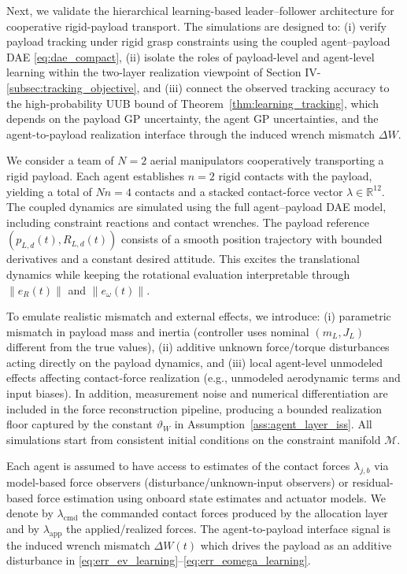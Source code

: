 \documentclass[letterpaper, 10 pt, conference]{ieeeconf}  %
\newcommand{\0}{\matr{0}}
\begin{document}
Next, we validate the hierarchical learning-based leader--follower architecture for cooperative rigid-payload transport.
The simulations are designed to: (i) verify payload tracking under rigid grasp constraints using the coupled agent--payload DAE \eqref{eq:dae_compact},
(ii) isolate the roles of payload-level and agent-level learning within the two-layer realization viewpoint of Section IV-\ref{subsec:tracking_objective}, and
(iii)  connect the observed tracking accuracy to the high-probability UUB bound of Theorem~\ref{thm:learning_tracking}, which depends on
the payload GP uncertainty, the agent GP uncertainties, and the agent-to-payload realization interface through the induced wrench mismatch $\Delta W$.


We consider a team of $N=2$ aerial manipulators cooperatively transporting a rigid payload.
Each agent establishes $n=2$ rigid contacts with the payload, yielding a total of $Nn=4$ contacts and a stacked contact-force vector
$\lambda\in\mathbb R^{12}$.
The coupled dynamics are simulated using the full agent--payload DAE model, including constraint reactions and contact wrenches. The payload reference $(p_{L,d}(t),R_{L,d}(t))$ consists of a smooth position trajectory with bounded derivatives and a constant desired attitude.
This excites the translational dynamics while keeping the rotational evaluation interpretable through $\|e_R(t)\|$ and $\|e_\omega(t)\|$.

To emulate realistic mismatch and external effects, we introduce:
(i) parametric mismatch in payload mass and inertia (controller uses nominal $(m_L,J_L)$ different from the true values),
(ii) additive unknown force/torque disturbances acting directly on the payload dynamics, and
(iii) local agent-level unmodeled effects affecting contact-force realization (e.g., unmodeled aerodynamic terms and input biases).
In addition, measurement noise and numerical differentiation are included in the force reconstruction pipeline, producing a bounded realization floor
captured by the constant $\vartheta_W$ in Assumption~\ref{ass:agent_layer_iss}.
All simulations start from consistent initial conditions on the constraint manifold $\mathcal{M}$.


Each agent is assumed to have access to estimates of the contact forces $\lambda_{j,b}$ via model-based force observers (disturbance/unknown-input observers) or residual-based force estimation using onboard state estimates and actuator models.
We denote by $\lambda_{\mathrm{cmd}}$ the commanded contact forces produced by the allocation layer and by $\lambda_{\mathrm{app}}$ the applied/realized forces.
The agent-to-payload interface signal is the induced wrench mismatch $\Delta W(t)$ which drives the payload as an additive disturbance in \eqref{eq:err_ev_learning}--\eqref{eq:err_eomega_learning}.
\end{document}
